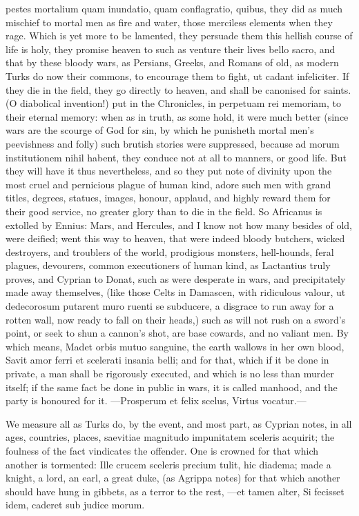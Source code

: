 {pestes mortalium quam inundatio, quam conflagratio, quibus, \etc{} they
did as much mischief to mortal men as fire and water, those merciless
elements when they rage. Which is yet more to be lamented, they
persuade them this hellish course of life is holy, they promise heaven
to such as venture their lives bello sacro, and that by these bloody
wars, as Persians, Greeks, and Romans of old, as modern Turks do now
their commons, to encourage them to fight, ut cadant infeliciter. If
they die in the field, they go directly to heaven, and shall be
canonised for saints. (O diabolical invention!) put in the Chronicles,
in perpetuam rei memoriam, to their eternal memory: when as in truth,
as some hold, it were much better (since wars are the scourge of
God for sin, by which he punisheth mortal men's peevishness and folly)
such brutish stories were suppressed, because ad morum institutionem
nihil habent, they conduce not at all to manners, or good life. But
they will have it thus nevertheless, and so they put note of
divinity upon the most cruel and pernicious plague of human kind,
adore such men with grand titles, degrees, statues, images,
honour, applaud, and highly reward them for their good service, no
greater glory than to die in the field. So Africanus is extolled by
Ennius: Mars, and Hercules, and I know not how many besides of
old, were deified; went this way to heaven, that were indeed bloody
butchers, wicked destroyers, and troublers of the world, prodigious
monsters, hell-hounds, feral plagues, devourers, common executioners of
human kind, as Lactantius truly proves, and Cyprian to Donat, such as
were desperate in wars, and precipitately made away themselves, (like
those Celts in Damascen, with ridiculous valour, ut dedecorosum
putarent muro ruenti se subducere, a disgrace to run away for a rotten
wall, now ready to fall on their heads,) such as will not rush on a
sword's point, or seek to shun a cannon's shot, are base cowards, and
no valiant men. By which means, Madet orbis mutuo sanguine, the earth
wallows in her own blood,
Savit amor ferri et scelerati insania belli; and for that, which
if it be done in private, a man shall be rigorously executed, and
which is no less than murder itself; if the same fact be done in public
in wars, it is called manhood, and the party is honoured for it.
---Prosperum et felix scelus,
Virtus vocatur.---

We measure all as Turks do, by the event, and most part, as Cyprian
notes, in all ages, countries, places, saevitiae magnitudo impunitatem
sceleris acquirit; the foulness of the fact vindicates the offender.
One is crowned for that which another is tormented: Ille crucem
sceleris precium tulit, hic diadema; made a knight, a lord, an earl, a
great duke, (as Agrippa notes) for that which another should have
hung in gibbets, as a terror to the rest,
---et tamen alter,
Si fecisset idem, caderet sub judice morum.

}
